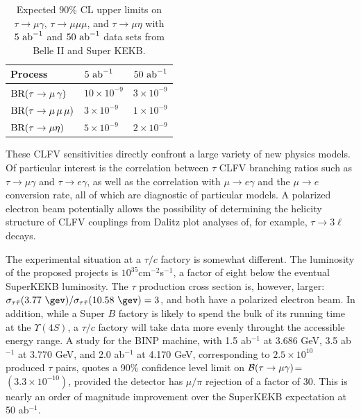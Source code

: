\begin{table}[!b]
  \caption{
    \label{tab:LFVExptSensitivities-BelleII}
    Expected $90\%$ CL upper limits
    on $\tau\to\mu\gamma$, $\tau\to \mu\mu\mu$, and $\tau\to \mu\eta$
    with $5 \ {\rm ab}^{-1}$ and  $50 \ {\rm ab}^{-1}$ data sets from Belle II and  Super KEKB.
  }
  \begin{center}
    \begin{tabular}{lll}
      \hline \hline
Process & $5\ {\rm ab}^{-1}$ & $50\ {\rm ab}^{-1}$  \\
      \hline
      $\BR(\tau \to \mu\,\gamma) \rule{0pt}{2.6ex}$ &  $10 \times 10^{-9}$ &  $3 \times 10^{-9}$  \\
      $\mbox{\rm BR}(\tau \to \mu\, \mu\, \mu)$ &  $3 \times 10^{-9}$ & $1 \times 10^{-9}$  \\
      $\mbox{\rm BR}(\tau \to \mu \eta)$             &  $5 \times 10^{-9}$ & $2\times 10^{-9}$    \\
 \hline\hline
    \end{tabular}
  \end{center}
\end{table}


These CLFV sensitivities directly confront a large variety of new
physics models. Of particular interest is the correlation between
$\tau$ CLFV branching ratios such as $\tau\to \mu\gamma$ and $\tau\to e
\gamma$, as well as the correlation with $\mu\to e \gamma$ and the
$\mu\to e$ conversion rate, all of which are diagnostic of particular
models.  A polarized electron beam potentially allows the possibility of determining the helicity structure of CLFV couplings from Dalitz plot analyses of, for example, $\tau \to 3\ell$ decays.

The experimental situation at a $\tau/c$ factory is somewhat different. The luminosity of the proposed projects is $10^{35}$cm$^{-2}$s$^{-1}$, a factor of eight below the eventual SuperKEKB luminosity. The $\tau$ production cross section is, however, larger: $\sigma_{\tau\bar{\tau}}(3.77\  \gev)/\sigma_{\tau\bar{\tau}}(10.58\  \gev)=3$, and both have a polarized electron beam. In addition, while a Super $B$ factory is likely to spend the bulk of its running time at the $\Upsilon(4S)$, a $\tau/c$ factory will take data more evenly throught the accessible energy range.  A study for the BINP machine, with 1.5 ab$^{-1}$ at 3.686 GeV,
3.5 ab$^{-1}$ at 3.770 GeV, and 2.0 ab$^{-1}$ at 4.170 GeV, 
corresponding to  $2.5\times 10^{10}$ produced $\tau$ pairs, quotes a 90\% confidence level limit on $\cal{B}(\tau\rightarrow\mu\gamma)$= $(3.3\times 10^{-10})$, provided the detector has $\mu/\pi$ rejection of a factor of 30. This is nearly an order of magnitude improvement over the SuperKEKB expectation at 50 ab$^{-1}$.


